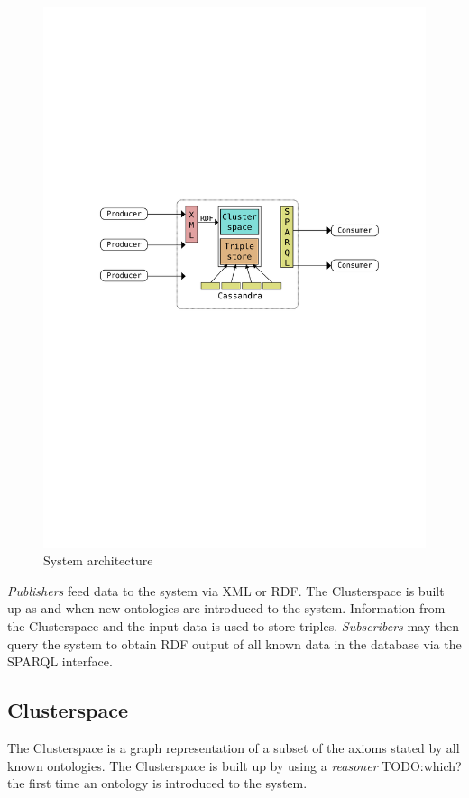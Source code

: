 \documentclass[conference]{IEEEtran}
\begin{document}
\begin{figure}
    \centering
    \includegraphics[scale=0.5]{images/architecture}
    \caption{System architecture}
    \label{fig:architecture}
\end{figure}

\emph{Publishers} feed data to the system via XML or RDF. The Clusterspace is
built up as and when new ontologies are introduced to the system. Information
from the Clusterspace and the input data is used to store triples.
\emph{Subscribers} may then query the system to obtain RDF output of all known
data in the database via the SPARQL interface.

\subsection{Clusterspace}
The Clusterspace is a graph representation of a subset of the axioms stated by
all known ontologies. The Clusterspace is built up by using a \emph{reasoner}
TODO:which? the first time an ontology is introduced to the system. 
\end{document}
